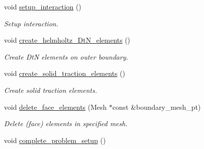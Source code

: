 \begin{DoxyCompactItemize}
void \hyperlink{classCoatedSphereProblem_aeea43c892871a6c65df992aedc3b3547}{setup\+\_\+interaction} ()
\begin{DoxyCompactList}\small\item\em Setup interaction. \end{DoxyCompactList}\item 
void \hyperlink{classCoatedSphereProblem_a867f4ed706f00a73c87c2c862dcf19c3}{create\+\_\+helmholtz\+\_\+\+Dt\+N\+\_\+elements} ()
\begin{DoxyCompactList}\small\item\em Create DtN elements on outer boundary. \end{DoxyCompactList}\item 
void \hyperlink{classCoatedSphereProblem_a93cb1d435858c7a1835cbd74f7cb5db8}{create\+\_\+solid\+\_\+traction\+\_\+elements} ()
\begin{DoxyCompactList}\small\item\em Create solid traction elements. \end{DoxyCompactList}\item 
void \hyperlink{classCoatedSphereProblem_a1092568f8c12afcefe7cbf56ebbb115c}{delete\+\_\+face\+\_\+elements} (Mesh $\ast$const \&boundary\+\_\+mesh\+\_\+pt)
\begin{DoxyCompactList}\small\item\em Delete (face) elements in specified mesh. \end{DoxyCompactList}\item 
void \hyperlink{classCoatedSphereProblem_a7417ba994216c3d817259891176cd392}{complete\+\_\+problem\+\_\+setup} ()
\end{DoxyCompactItemize}

